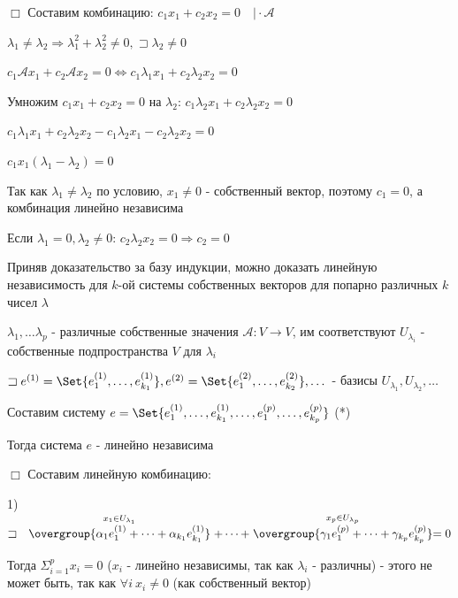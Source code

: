 \documentclass[12pt]{article}
\begin{document}
    $\Box$ Составим комбинацию: $c_1 x_1 + c_2 x_2 = 0 \quad \Big| \cdot \mathcal{A}$

    $\lambda_1 \neq \lambda_2 \Longrightarrow \lambda_1^2 + \lambda_2^2 \neq 0, \sqsupset \lambda_2 \neq 0$

    $c_1 \mathcal{A} x_1 + c_2 \mathcal{A} x_2 = 0 \Longleftrightarrow c_1 \lambda_1 x_1 + c_2 \lambda_2 x_2 = 0$

    Умножим $c_1 x_1 + c_2 x_2 = 0$ на $\lambda_2$: $c_1 \lambda_2 x_1 + c_2 \lambda_2 x_2 = 0$

    $c_1 \lambda_1 x_1 + c_2 \lambda_2 x_2 - c_1 \lambda_2 x_1 - c_2 \lambda_2 x_2 = 0$

    $c_1 x_1(\lambda_1 - \lambda_2) = 0$

    Так как $\lambda_1 \neq \lambda_2$ по условию, $x_1 \neq 0$ - собственный вектор, поэтому $c_1 = 0$, а комбинация линейно независима

    Если $\lambda_1 = 0, \lambda_2 \neq 0$: $c_2 \lambda_2 x_2 = 0 \Longrightarrow c_2 = 0$

    \Nota Приняв доказательство за базу индукции, можно доказать линейную независимость для $k$-ой системы собственных векторов для попарно различных $k$ чисел $\lambda$



    \Th $\lambda_1, \dots \lambda_p$ - различные собственные значения $\mathcal{A} : V \rightarrow V$,
    им соответствуют $U_{\lambda_i}$ - собственные подпространства $V$ для $\lambda_i$

    $\sqsupset e^{(1)} = \Set{e^{(1)}_1, \dots, e^{(1)}_{k_1}}, e^{(2)} = \Set{e^{(2)}_1, \dots, e^{(2)}_{k_2}}, \dots$ -
    базисы $U_{\lambda_1}, U_{\lambda_2}, \dots$

    Составим систему $e = \Set{e^{(1)}_1, \dots, e^{(1)}_{k_1}, \dots, e^{(p)}_1, \dots, e^{(p)}_{k_p}}$ (*)

    Тогда система $e$ - линейно независима

    $\Box$ Составим линейную комбинацию:

    1) $\sqsupset \quad \stackrel{x_1 \in U_{\lambda_1}}{\overgroup{\alpha_1 e^{(1)}_1 + \dots + \alpha_{k_1} e^{(1)}_{k_1}}} + \dots +
    \stackrel{x_p \in U_{\lambda_p}}{\overgroup{\gamma_1 e^{(p)}_1 + \dots + \gamma_{k_p} e^{(p)}_{k_p}}} = 0$

    Тогда $\Sigma_{i=1}^p x_i = 0$ ($x_i$ - линейно независимы, так как $\lambda_i$ - различны) - этого не может быть, так как $\forall i \ x_i \neq 0$ (как собственный вектор)
\end{document}
